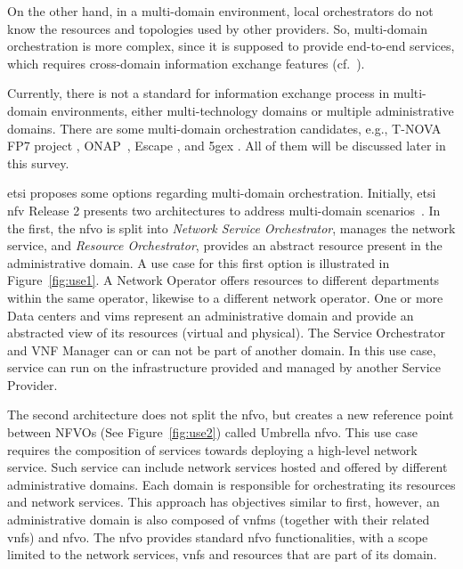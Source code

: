 On the other hand, in a multi-domain environment,  local orchestrators do not know the resources and topologies used by other providers. So, multi-domain orchestration is more complex, since it is supposed to provide end-to-end services, which requires cross-domain information exchange features (cf.~\cite{md2}). 

Currently, there is not a standard for information exchange process in multi-domain environments, either multi-technology domains or multiple administrative domains. There are some multi-domain orchestration candidates, e.g., T-NOVA FP7 project \cite{FP7projectT-NOVAT-NOVAInfrastructures}, ONAP~\cite{onap}, Escape \cite{Sonkoly2015Multi-DomainClouds}, and \gls{5gex} \cite{Bernardos20155GInfrastructures}. All of them will be discussed later in this survey.

\gls{etsi} proposes some options regarding multi-domain orchestration. Initially, \gls{etsi} \gls{nfv}  Release 2 presents two architectures to address multi-domain scenarios~\cite{ETSIIndustrySpecificationGroupISGNFV2014NetworkOptions}. In the first, the \gls{nfvo} is split into \textit{Network Service Orchestrator}, manages the network service, and \textit{Resource Orchestrator}, provides an abstract resource present in the administrative domain. A use case for this first option is illustrated in Figure~\ref{fig:use1}. A Network Operator offers resources to different departments within the same operator, likewise to a different network operator. One or more Data centers and \glspl{vim} represent an administrative domain and provide an abstracted view of its resources (virtual and physical). The Service Orchestrator and VNF Manager can or can not be part of another domain. In this use case, service can run on the infrastructure provided and managed by another Service Provider.


The second architecture does not split the \gls{nfvo}, but creates a new reference point between NFVOs (See Figure~\ref{fig:use2}) called  Umbrella \gls{nfvo}. This use case requires the composition of services towards deploying a high-level network service. Such service can include network services hosted and offered by different administrative domains. Each domain is responsible for orchestrating its resources and network services. This approach has objectives similar to first, however, an administrative domain is also composed of \glspl{vnfm} (together with their related \glspl{vnf}) and \gls{nfvo}. The \gls{nfvo} provides standard \gls{nfvo} functionalities, with a scope limited to the network services, \glspl{vnf} and resources that are part of its domain.

